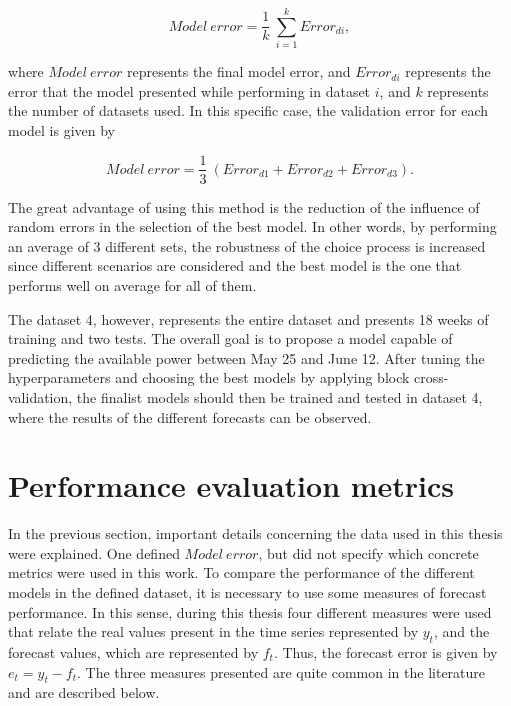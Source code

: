 \begin{equation}
     Model\ error =\frac {1}{k}\ \sum_{i=1}^k Error_{di},
\label{err_av}
\end{equation}

where $Model\ error$ represents the final model error, and $Error_{di}$ represents the error that the model presented while performing in dataset $i$, and $k$ represents the number of datasets used.
In this specific case, the validation error for each model is given by

\begin{equation}
     Model\ error =\frac {1}{3}\ (Error_{d1} + Error_{d2} + Error_{d3}).
\label{err_av}
\end{equation}

The great advantage of using this method is the reduction of the influence of random errors in the selection of the best model. In other words, by performing an average of 3 different sets, the robustness of the choice process is increased since different scenarios are considered and the best model is the one that performs well on average for all of them.

The dataset 4, however, represents the entire dataset and presents 18 weeks of training and two tests. The overall goal is to propose a model capable of predicting the available power between May 25 and June 12. After tuning the hyperparameters and choosing the best models by applying block cross-validation, the finalist models should then be trained and tested in dataset 4, where the results of the different forecasts can be observed.

\section{Performance evaluation metrics}\label{chap5:evaluation}

In the previous section, important details concerning the data used in this thesis were explained. One defined $Model\ error$, but did not specify which concrete metrics were used in this work. To compare the performance of the different models in the defined dataset, it is necessary to use some measures of forecast performance. In this sense, during this thesis four different measures were used that relate the real values present in the time series represented by $y_t$, and the forecast values, which are represented by $f_t$. Thus, the forecast error is given by $e_t=y_t-f_t$. The three measures presented are quite common in the literature \cite{} and are described below.

